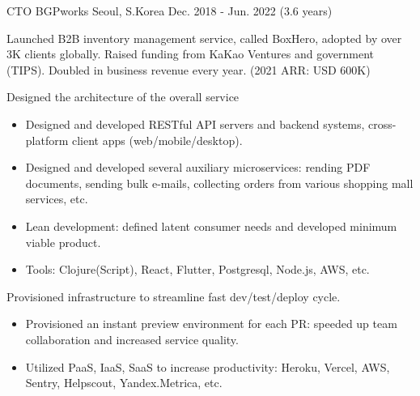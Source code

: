 

\begin{cventries}

  \cventry
    {CTO} %
    {BGPworks} %
    {Seoul, S.Korea} %
    {Dec. 2018 - Jun. 2022 (3.6 years)} %
    {
      Launched B2B inventory management service, called BoxHero, adopted by over 3K clients globally. Raised funding from KaKao Ventures and government (TIPS). Doubled in business revenue every year. (2021 ARR: USD 600K)\newline
      \vspace{6mm}
      \begin{cvitems} %
        \item Designed the architecture of the overall service
        \begin{itemize}[leftmargin=2ex]
          \item Designed and developed RESTful API servers and backend systems, cross-platform client apps (web/mobile/desktop).
          \item Designed and developed several auxiliary microservices: rending PDF documents, sending bulk e-mails, collecting orders from various shopping mall services, etc.
          \item Lean development: defined latent consumer needs and developed minimum viable product.
          \item Tools: Clojure(Script), React, Flutter, Postgresql, Node.js, AWS, etc.
        \end{itemize}
        \item Provisioned infrastructure to streamline fast dev/test/deploy cycle.
        \begin{itemize}[leftmargin=2ex]
          \item Provisioned an instant preview environment for each PR: speeded up team collaboration and increased service quality.
          \item Utilized PaaS, IaaS, SaaS to increase productivity: Heroku, Vercel, AWS, Sentry, Helpscout, Yandex.Metrica, etc.

\end{itemize}
\end{cvitems}}
\end{cventries}
